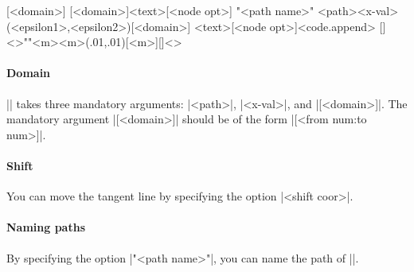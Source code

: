\begin{tzdef}{}
[<domain>]
[<domain>]{<text>}[<node opt>]
"<path name>"
            {<path>}{<x-val>}(<epsilon1>,<epsilon2>)[<domain>]
            {<text>}[<node opt>]<code.append>
  []<>""{<m>}{<m>}(.01,.01)[<m>]{}[]<>
\end{tzdef}


\paragraph{Domain}
|\tztangentat| takes three mandatory arguments: |{<path>}|, |{<x-val>}|, and |[<domain>]|. The mandatory argument |[<domain>]| should be of the form |[<from num:to num>]|.

\begin{tzcode}{.3}
{}
\end{tzcode}


\paragraph{Shift}
You can move the tangent line by specifying the option |<shift coor>|.

\begin{tzcode}{.3}
\end{tzcode}

\paragraph{Naming paths}
By specifying the option |"<path name>"|, you can name the path of |\tztangentat|.

\begin{tzcode}{.3}
\end{tzcode}

